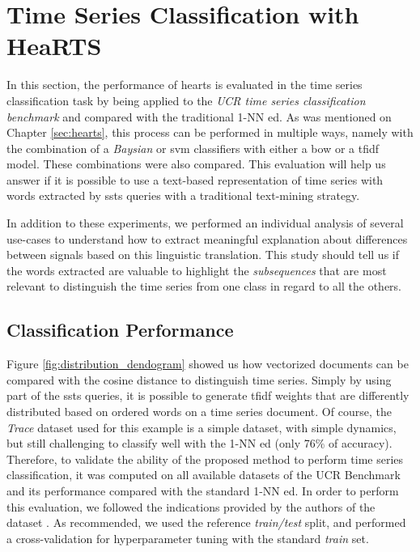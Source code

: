 \section{Time Series Classification with HeaRTS}

In this section, the performance of \gls{hearts} is evaluated in the time series classification task by being applied to the \textit{UCR time series classification benchmark} and compared with the traditional 1-NN \gls{ed}. As was mentioned on Chapter \ref{sec:hearts}, this process can be performed in multiple ways, namely with the combination of a \textit{Baysian} or \gls{svm} classifiers with either a \gls{bow} or a \gls{tfidf} model. These combinations were also compared. This evaluation will help us answer if it is possible to use a text-based representation of time series with words extracted by \gls{ssts} queries with a traditional text-mining strategy.

In addition to these experiments, we performed an individual analysis of several use-cases to understand how to extract meaningful explanation about differences between signals based on this linguistic translation. This study should tell us if the words extracted are valuable to highlight the \textit{subsequences} that are most relevant to distinguish the time series from one class in regard to all the others. 

\subsection{Classification Performance}

Figure \ref{fig:distribution_dendogram} showed us how vectorized documents can be compared with the cosine distance to distinguish time series. Simply by using part of the \gls{ssts} queries, it is possible to generate \gls{tfidf} weights that are differently distributed based on ordered words on a time series document. Of course, the \textit{Trace} dataset used for this example is a simple dataset, with simple dynamics, but still challenging to classify well with the 1-NN \gls{ed} (only 76\% of accuracy). Therefore, to validate the ability of the proposed method to perform time series classification, it was computed on all available datasets of the UCR Benchmark and its performance compared with the standard 1-NN \gls{ed}. In order to perform this evaluation, we followed the indications provided by the authors of the dataset \cite{ucr}. As recommended, we used the reference \textit{train/test} split, and performed a cross-validation for hyperparameter tuning with the standard \textit{train} set.

